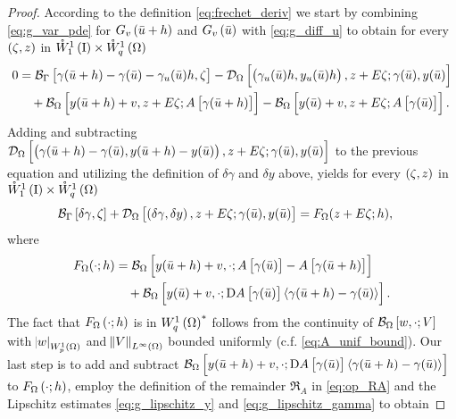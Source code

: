 \documentclass[final]{siamltex}
\begin{document}
\begin{proof}
According to the definition \eqref{eq:frechet_deriv} we start by combining \eqref{eq:g_var_pde} for $G_v\del{{\bar{u}}+h}$ and $G_v\del{\bar{u}}$ with \eqref{eq:g_diff_u} to obtain for every $\del{\zeta,z}$ in ${{\mathring{W}^{1}_{1}\del{{\text{\rm I}}}}} \times {{\mathring{W}^{1}_{q}\del{\Omega}}}$ 
	\begin{align*}
		0 	&= {{\mathcal{B}}_\Gamma}\sbr{\gamma({\bar{u}}+h) - \gamma({\bar{u}}) - \gamma_u({\bar{u}})h, \zeta} 
				- {{\mathcal{D}}_\Omega}\sbr{\del{\gamma_u({\bar{u}})h, y_u({\bar{u}})h}, z + E\zeta; \gamma({\bar{u}}), y({\bar{u}})}\\
			&\quad + {{\mathcal{B}}_\Omega}\sbr{y({\bar{u}}+h)+v, z+E\zeta; A\sbr{\gamma({\bar{u}}+h)}} - {{\mathcal{B}}_\Omega}\sbr{y({\bar{u}})+v, z+E\zeta; A\sbr{\gamma({\bar{u}})}}.		 
	\end{align*}
Adding and subtracting ${{\mathcal{D}}_\Omega}\sbr{\del{\gamma({\bar{u}}+h) - \gamma({\bar{u}}), y({\bar{u}}+h)-y({\bar{u}})}, z + E\zeta;\gamma({\bar{u}}),y({\bar{u}})}$ to the previous equation and utilizing the definition of $\delta\gamma$ and $\delta y$ above, yields for  every  $\del{\zeta, z}$ in ${{\mathring{W}^{1}_{1}\del{{\text{\rm I}}}}} \times {{\mathring{W}^{1}_{q}\del{\Omega}}}$
	\begin{align*}
		{{\mathcal{B}}_\Gamma}\sbr{\delta \gamma, \zeta} + {{\mathcal{D}}_\Omega}\sbr{\del{\delta \gamma, \delta y}, z + E\zeta; \gamma({\bar{u}}), y({\bar{u}})}
			&= F_\Omega(z + E\zeta;h),
	\end{align*}
where
	\begin{align*}
		F_\Omega(\cdot;h) &= 
			{{\mathcal{B}}_\Omega}\sbr{y({\bar{u}}+h) + v, \cdot; A\sbr{\gamma({\bar{u}})}-A\sbr{\gamma({\bar{u}}+h)} } \\
			&\quad +{{\mathcal{B}}_\Omega}\sbr{y({\bar{u}}) + v, \cdot; \Dif A\sbr{\gamma({\bar{u}})}{\langle {\gamma({\bar{u}}+h) - \gamma({\bar{u}})} \rangle}}.
	\end{align*}
The fact that $F_\Omega\del{\cdot;h}$ is in ${{W^{1}_{q}\del{\Omega}}}^*$ follows from the
continuity of ${{\mathcal{B}}_\Omega}\sbr{w,\cdot;V}$ with ${\abs{{w}}_{{W^{{1}}_{{p}}\del{{\Omega}}}}}$ and
${\norm{{V}}_{{L^\infty\del{{\Omega}}}}}$ bounded uniformly
(c.f. \eqref{eq:A_unif_bound}). Our last step is to add and subtract
${{\mathcal{B}}_\Omega}\sbr{y({\bar{u}}+h) + v, \cdot; \Dif
  A\sbr{\gamma({\bar{u}})}{\langle {\gamma({\bar{u}}+h) - \gamma({\bar{u}})} \rangle}}$ to
$F_\Omega\del{\cdot;h}$, employ the definition of the remainder ${\mathfrak{R}}_A$ in \eqref{eq:op_RA} and the Lipschitz estimates \eqref{eq:g_lipschitz_y} and \eqref{eq:g_lipschitz_gamma} to obtain

\end{proof}
\end{document}
